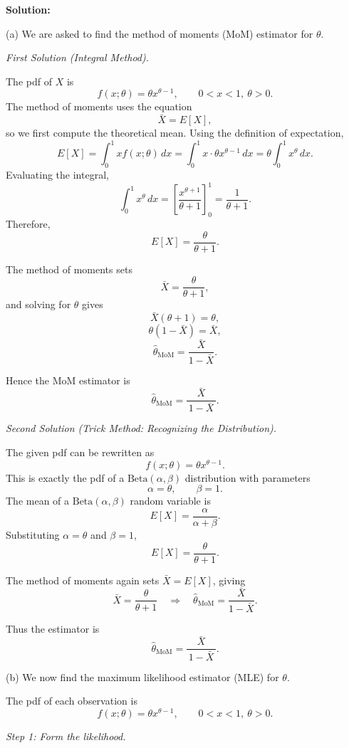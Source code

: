 \documentclass[11pt,letterpaper]{article}
\theoremstyle{remark}
\begin{document}
\vspace{1cm}

\textbf{Solution:}

(a) We are asked to find the method of moments (MoM) estimator for $\theta$.

\medskip
\textit{First Solution (Integral Method).}

The pdf of $X$ is
\[
f(x;\theta) = \theta x^{\theta-1}, \qquad 0 < x < 1,\ \theta>0.
\]
The method of moments uses the equation
\[
\bar X = E[X],
\]
so we first compute the theoretical mean. Using the definition of expectation,
\[
E[X]
= \int_0^1 x f(x;\theta)\,dx
= \int_0^1 x \cdot \theta x^{\theta-1}\,dx
= \theta \int_0^1 x^{\theta}\,dx.
\]
Evaluating the integral,
\[
\int_0^1 x^{\theta}\,dx =
\left[ \frac{x^{\theta+1}}{\theta+1} \right]_0^1
= \frac{1}{\theta+1}.
\]
Therefore,
\[
E[X] = \frac{\theta}{\theta+1}.
\]

The method of moments sets
\[
\bar X = \frac{\theta}{\theta+1},
\]
and solving for $\theta$ gives
\[
\bar X(\theta+1) = \theta,
\]
\[
\theta(1 - \bar X) = \bar X,
\]
\[
\hat{\theta}_{\text{MoM}}
= \frac{\bar X}{1 - \bar X}.
\]

Hence the MoM estimator is
\[
\boxed{\hat{\theta}_{\text{MoM}} = \frac{\bar X}{\,1 - \bar X\,}}.
\]

\bigskip
\textit{Second Solution (Trick Method: Recognizing the Distribution).}

The given pdf can be rewritten as
\[
f(x;\theta) = \theta x^{\theta-1}.
\]
This is exactly the pdf of a $\mathrm{Beta}(\alpha,\beta)$ distribution with parameters
\[
\alpha = \theta, \qquad \beta = 1.
\]
The mean of a $\mathrm{Beta}(\alpha,\beta)$ random variable is
\[
E[X] = \frac{\alpha}{\alpha+\beta}.
\]
Substituting $\alpha=\theta$ and $\beta=1$,
\[
E[X] = \frac{\theta}{\theta+1}.
\]

The method of moments again sets $\bar X = E[X]$, giving
\[
\bar X = \frac{\theta}{\theta+1}
\quad\Longrightarrow\quad
\hat{\theta}_{\text{MoM}} = \frac{\bar X}{1-\bar X}.
\]

Thus the estimator is
\[
\boxed{\hat{\theta}_{\text{MoM}} = \frac{\bar X}{\,1 - \bar X\,}}.
\]

\vspace{1cm}

(b) We now find the maximum likelihood estimator (MLE) for $\theta$.

The pdf of each observation is
\[
f(x;\theta) = \theta x^{\theta-1}, \qquad 0 < x < 1, \ \theta > 0.
\]

\textit{Step 1: Form the likelihood.}
\end{document}

